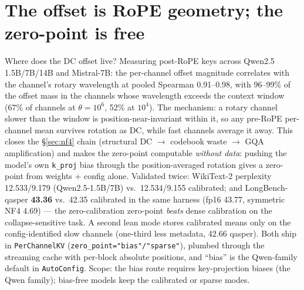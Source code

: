 \documentclass[11pt]{article}
\begin{document}
\section{The offset is RoPE geometry; the zero-point is free}\label{sec:rope}
Where does the DC offset live? Measuring post-RoPE keys across Qwen2.5
1.5B/7B/14B and Mistral-7B: the per-channel offset magnitude correlates with
the channel's rotary wavelength at pooled Spearman 0.91--0.98, with
96--99\% of the offset mass in the channels whose wavelength exceeds the
context window (67\% of channels at $\theta{=}10^6$, 52\% at $10^4$). The
mechanism: a rotary channel slower than the window is position-near-invariant
within it, so any pre-RoPE per-channel mean survives rotation as DC, while
fast channels average it away. This closes the \S\ref{sec:nf4} chain
(structural DC $\rightarrow$ codebook waste $\rightarrow$ GQA amplification)
and makes the zero-point computable \emph{without data}: pushing the model's
own \texttt{k\_proj} bias through the position-averaged rotation gives a
zero-point from weights + config alone. Validated twice: WikiText-2
perplexity 12.533/9.179 (Qwen2.5-1.5B/7B) vs.\ 12.534/9.155 calibrated; and
LongBench-qasper \textbf{43.36} vs.\ 42.35 calibrated in the same harness
(fp16 43.77, symmetric NF4 4.69) --- the zero-calibration zero-point
\emph{beats} dense calibration on the collapse-sensitive task. A second lean
mode stores calibrated means only on the config-identified slow channels
(one-third less metadata, 42.66 qasper). Both ship in \texttt{PerChannelKV}
(\texttt{zero\_point="bias"/"sparse"}), plumbed through the streaming cache
with per-block absolute positions, and ``bias'' is the Qwen-family default in
\texttt{AutoConfig}. Scope: the bias route requires key-projection biases
(the Qwen family); bias-free models keep the calibrated or sparse modes.
\end{document}
